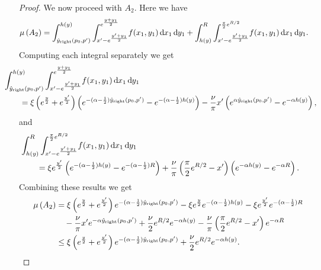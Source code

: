 \begin{proof}
We now proceed with $A_2$. Here we have
\begin{align*}
	\mu\left(A_2\right) &= \int_{\hat{y}_{\text{right}}(p_0,p^\prime)}^{h(y)} 
		\int_{x^\prime - e^{\frac{y^\prime + y_1}{2}}}^{e^{\frac{y+y_1}{2}}} \hspace{-2pt} 
		f(x_1,y_1) \operatorname{\mathrm{d}\hspace{-2pt}} x_1 \operatorname{\mathrm{d}\hspace{-2pt}} y_1
		+ \int_{h(y)}^{R} \int_{x^\prime - e^{\frac{y^\prime + y_1}{2}}}^{\frac{\pi}{2}e^{R/2}} 
		\hspace{-2pt}  f(x_1,y_1) \operatorname{\mathrm{d}\hspace{-2pt}} x_1 \operatorname{\mathrm{d}\hspace{-2pt}} y_1.
\end{align*}
Computing each integral separately we get
\begin{align*}
	&\hspace{-20pt}\int_{\hat{y}_{\text{right}}(p_0,p^\prime)}^{h(y)} 
		\int_{x^\prime - e^{\frac{y^\prime + y_1}{2}}}^{e^{\frac{y+y_1}{2}}} \hspace{-2pt} 
		f(x_1,y_1) \dd x_1 \dd y_1\\
	&= \xi \left(e^{\frac{y}{2}} + e^{\frac{y^\prime}{2}}\right)
		\left(e^{-(\alpha - \frac{1}{2})\hat{y}_{\text{right}}(p_0,p^\prime)} 
		- e^{-(\alpha - \frac{1}{2})h(y)}\right) 
		- \frac{\nu}{\pi} x^\prime \left(e^{\alpha \hat{y}_{\text{right}}(p_0,p^\prime)}
		 - e^{-\alpha h(y)}\right), 
\end{align*}
and
\begin{align*}
	&\hspace{-20pt}\int_{h(y)}^{R} \int_{x^\prime - e^{\frac{y^\prime + y_1}{2}}}^{\frac{\pi}{2}e^{R/2}} 
		\hspace{-2pt}  f(x_1,y_1) \dd x_1 \dd y_1\\
	&= \xi e^{\frac{y^\prime}{2}}\left(e^{-(\alpha - \frac{1}{2})h(y)} - e^{-(\alpha - \frac{1}{2})R}\right)
		+ \frac{\nu}{\pi}\left(\frac{\pi}{2}e^{R/2} - x^\prime\right)\left(e^{-\alpha h(y)} - e^{-\alpha R}\right).
\end{align*}
Combining these results we get
\begin{align*}
	\mu\left(A_2\right) &= \xi \left(e^{\frac{y}{2}} + e^{\frac{y^\prime}{2}}\right)
		e^{-(\alpha - \frac{1}{2})\hat{y}_{\text{right}}(p_0,p^\prime)} 
		- \xi e^{\frac{y}{2}}e^{-(\alpha - \frac{1}{2})h(y)} 
		- \xi e^{\frac{y^\prime}{2}}e^{-(\alpha - \frac{1}{2})R} \\
	&\hspace{10pt}- \frac{\nu}{\pi} x^\prime e^{-\alpha \hat{y}_{\text{right}}(p_0,p^\prime)}
		+ \frac{\nu}{2} e^{R/2} e^{-\alpha h(y)} - \frac{\nu}{\pi}\left(\frac{\pi}{2}e^{R/2} - x^\prime\right)
		e^{-\alpha R}\\
	&\le \xi \left(e^{\frac{y}{2}} + e^{\frac{y^\prime}{2}}\right)
		e^{-(\alpha - \frac{1}{2})\hat{y}_{\text{right}}(p_0,p^\prime)} + \frac{\nu}{2} e^{R/2} e^{-\alpha h(y)}.
\end{align*}


\end{proof}
